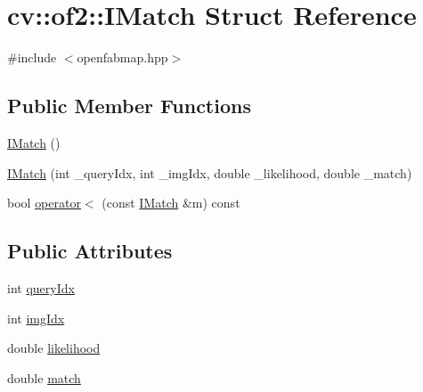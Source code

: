 \hypertarget{structcv_1_1of2_1_1IMatch}{\section{cv\-:\-:of2\-:\-:I\-Match Struct Reference}
\label{structcv_1_1of2_1_1IMatch}
}


{\ttfamily \#include $<$openfabmap.\-hpp$>$}

\subsection*{Public Member Functions}
\begin{DoxyCompactItemize}
\item 
\hyperlink{structcv_1_1of2_1_1IMatch_abf26086f41df0f003c3c9ddc2c65cb6a}{I\-Match} ()
\item 
\hyperlink{structcv_1_1of2_1_1IMatch_ad2bdda6d26d655c92e3f53f17f4dddf2}{I\-Match} (int \-\_\-query\-Idx, int \-\_\-img\-Idx, double \-\_\-likelihood, double \-\_\-match)
\item 
bool \hyperlink{structcv_1_1of2_1_1IMatch_adecd9024eeab5f2cb9b52214e7c1574e}{operator$<$} (const \hyperlink{structcv_1_1of2_1_1IMatch}{I\-Match} \&m) const 
\end{DoxyCompactItemize}
\subsection*{Public Attributes}
\begin{DoxyCompactItemize}
\item 
int \hyperlink{structcv_1_1of2_1_1IMatch_a380026520adf3bc4f23d88e555c0c416}{query\-Idx}
\item 
int \hyperlink{structcv_1_1of2_1_1IMatch_a16a6b2213c03216c9ff356b7c7e5261f}{img\-Idx}
\item 
double \hyperlink{structcv_1_1of2_1_1IMatch_ac575fd8f8f6cf87b965572681b7fa86b}{likelihood}
\item 
double \hyperlink{structcv_1_1of2_1_1IMatch_a5b3f46b8e7a86ae551c287596b751dab}{match}
\end{DoxyCompactItemize}


